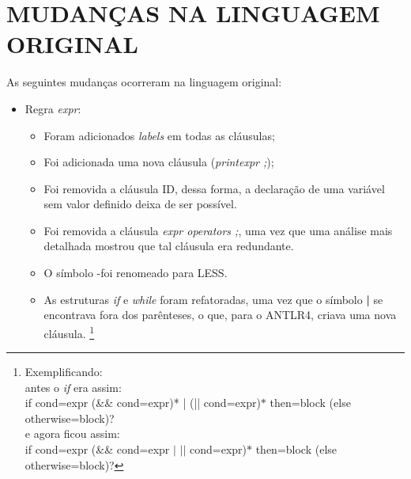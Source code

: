 \section{\normalsize MUDANÇAS NA LINGUAGEM ORIGINAL}
	As seguintes mudanças ocorreram na linguagem original:
	\begin{itemize}
		\item Regra \textit{expr}:
			\begin{itemize}
				\item Foram adicionados \textit{labels} em todas as cláusulas;
				\item Foi adicionada uma nova cláusula (\textit{\textquotesingle print\textquotesingle expr \textquotesingle ;\textquotesingle});
				\item Foi removida a cláusula ID, dessa forma, a declaração de uma variável sem valor definido deixa de ser possível.
				\item Foi removida a cláusula \textit{expr operators \textquotesingle ;\textquotesingle}, uma vez que uma análise mais detalhada mostrou que tal cláusula era redundante.
				\item O símbolo \textquotesingle -\textquotesingle foi renomeado para LESS.
				\item As estruturas \textit{if} e \textit{while} foram refatoradas, uma vez que o símbolo \textbf{|} se encontrava fora dos parênteses, o que, para o ANTLR4, criava uma nova cláusula. \footnote{Exemplificando: \\antes o \textit{if} era assim:\\\textquotesingle if\textquotesingle \vspace{0.1cm} cond=expr (\textquotesingle \&\&\textquotesingle  \vspace{0.1cm} cond=expr)* | (\textquotesingle ||\textquotesingle  \vspace{0.1cm} cond=expr)$*$ then=block (\textquotesingle else\textquotesingle  \vspace{0.1cm} otherwise=block)?\\e agora ficou assim:\\ \textquotesingle if\textquotesingle \vspace{0.1cm} cond=expr (\textquotesingle \&\&\textquotesingle \vspace{0.1cm} cond=expr $|$ \textquotesingle $||$\textquotesingle \vspace{0.1cm} cond=expr)$*$ then=block (\textquotesingle else\textquotesingle \vspace{0.1cm} otherwise=block)?}
			\end{itemize}
		

\end{itemize}
